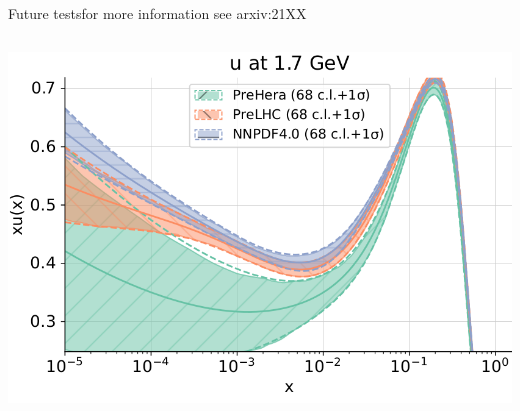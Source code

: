 \begin{frame}{Future tests}{for more information see arxiv:21XX}
\begin{columns}
        \includegraphics[width=1.0\textwidth]{juan_future_hyperopt/diffu}

    \end{columns}
\end{frame}

